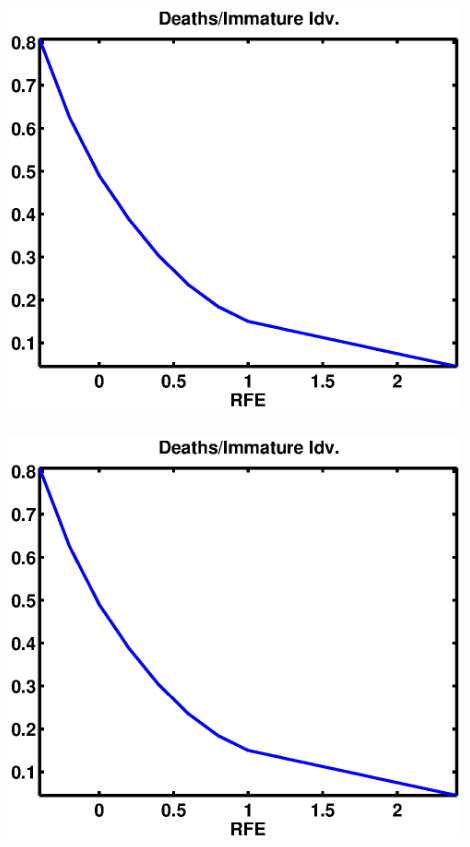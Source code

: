 \documentclass[mathserif]{beamer}
\begin{document}
\begin{frame}
\begin{center}
\frametitle{\insertsubsection}
\includegraphics[width=0.9\textwidth]{mortMat}
\end{center}
\end{frame}

\begin{frame}
\begin{center}
\frametitle{\insertsubsection}
\includegraphics[width=0.9\textwidth]{mortImm}
\end{center}
\end{frame}
\end{document}
